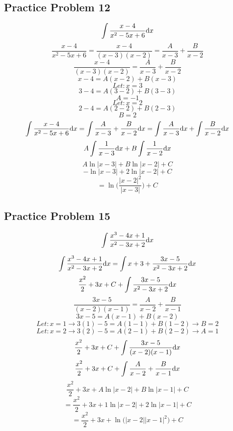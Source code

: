 \documentclass{math}
\begin{document}
\subsection*{Practice Problem 12}
\[ \int{\frac{x-4}{x^{2}-5x+6}\mathrm{d}{x}} \]
\[ \frac{x-4}{x^{2}-5x+6} =
   \frac{x-4}{(x-3)(x-2)} = \frac{A}{x-3}+\frac{B}{x-2} \]
\[ \frac{x-4}{(x-3)(x-2)} = \frac{A}{x-3}+\frac{B}{x-2} \]
\[ x-4 = A(x-2)+B(x-3) \]
\[ Let: x = 3 \]
\[ 3-4 = A(3-2)+B(3-3) \]
\[ A = -1 \]
\[ Let: x = 2 \]
\[ 2-4 = A(2-2)+B(2-3) \]
\[ B = 2 \]
\[ \int{\frac{x-4}{x^{2}-5x+6}\mathrm{d}{x}} =
   \int{\frac{A}{x-3}+\frac{B}{x-2}\mathrm{d}{x}} =
   \int{\frac{A}{x-3}\mathrm{d}{x}}+\int{\frac{B}{x-2}\mathrm{d}{x}} \]
\[ A\int{\frac{1}{x-3}\mathrm{d}{x}}+B\int{\frac{1}{x-2}\mathrm{d}{x}} \]
\[ A\ln|x-3|+B\ln|x-2|+C \]
\[ -\ln|x-3|+2\ln|x-2|+C \]
\[ = \ln\bigg(\frac{|x-2|^{2}}{|x-3|}\bigg)+C \]

\subsection*{Practice Problem 15}
\[ \int{\frac{x^{3}-4x+1}{x^{2}-3x+2}\mathrm{d}{x}} \]
\begin{center}
\end{center}
\[ \int{\frac{x^{3}-4x+1}{x^{2}-3x+2}\mathrm{d}{x}} =
   \int{x+3+\frac{3x-5}{x^{2}-3x+2}\mathrm{d}{x}} \]
\[ \frac{x^{2}}{2}+3x+C+\int{\frac{3x-5}{x^{2}-3x+2}\mathrm{d}{x}} \]
\[ \frac{3x-5}{(x-2)(x-1)} = \frac{A}{x-2}+\frac{B}{x-1} \]
\[ 3x-5 = A(x-1)+B(x-2) \]
\[ Let: x = 1 \rightarrow 3(1)-5 = A(1-1)+B(1-2) \rightarrow B = 2 \]
\[ Let: x = 2 \rightarrow 3(2)-5 = A(2-1)+B(2-2) \rightarrow A = 1 \]
\[ \frac{x^{2}}{2}+3x+C+\int{\frac{3x-5}{(x-2)(x-1)}\mathrm{d}{x}} \]
\[ \frac{x^{2}}{2}+3x+C+\int{\frac{A}{x-2}+\frac{B}{x-1}\mathrm{d}{x}} \]
\[ \frac{x^{2}}{2}+3x+A\ln|x-2|+B\ln|x-1|+C \]
\[ = \frac{x^{2}}{2}+3x+1\ln|x-2|+2\ln|x-1|+C \]
\[ = \frac{x^{2}}{2}+3x+\ln\bigg(|x-2||x-1|^{2}\bigg)+C \]
\end{document}
